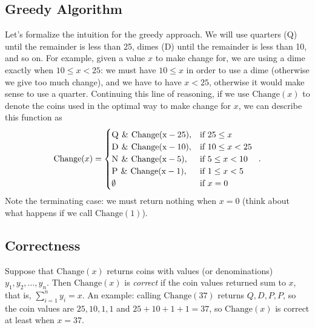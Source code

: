 \documentclass[paper=a4, fontsize=11pt]{scrartcl} %
\numberwithin{equation}{section} %
\numberwithin{figure}{section} %
\numberwithin{table}{section} %
\begin{document}
\subsection{Greedy Algorithm}
Let's formalize the intuition for the greedy approach.
We will use quarters (Q) until the remainder is less than 25\cent, dimes (D) until the remainder is less than 10\cent, and so on.
For example, given a value $x$ to make change for, we are using a dime exactly when $10 \leq x < 25$: we must have $10 \leq x$ in order to use a dime (otherwise we give too much change), and we have to have $x < 25$, otherwise it would make sense to use a quarter.
Continuing this line of reasoning, if we use $\mathrm{Change}(x)$ to denote the coins used in the optimal way to make change for $x$, we can describe this function as
\begin{equation}\label{ChangeEq}
\mathrm{Change}(x) = \begin{cases} 
\textsc{Q} \hspace{.05in} \& \hspace{.05in} \mathrm{Change(x-25)}, & \mbox{if } 25 \leq x \\
\textsc{D} \hspace{.05in} \& \hspace{.05in} \mathrm{Change(x-10)}, & \mbox{if } 10 \leq x < 25 \\
\textsc{N} \hspace{.05in} \& \hspace{.05in} \mathrm{Change(x-5)}, & \mbox{if } 5 \leq x < 10 \\
\textsc{P} \hspace{.05in} \& \hspace{.05in} \mathrm{Change(x-1)}, & \mbox{if } 1 \leq x < 5 \\
\emptyset & \mbox{if } x = 0
\end{cases} \enspace .
\end{equation}
Note the terminating case: we must return nothing when $x = 0$ (think about what happens if we call $\mathrm{Change}(1)$).

\subsection{Correctness}
Suppose that $\mathrm{Change}(x)$ returns coins with values (or denominations) $y_1, y_2, \ldots, y_n$.
Then $\mathrm{Change}(x)$ is \emph{correct} if the coin values returned sum to $x$, that is, $\sum_{i=1}^n y_i = x$.
An example: calling $\mathrm{Change}(37)$ returns $Q, D, P, P$, so the coin values are $25, 10, 1, 1$ and $25 + 10 + 1 + 1 = 37$, so $\mathrm{Change}(x)$ is correct at least when $x = 37$.
\end{document}
